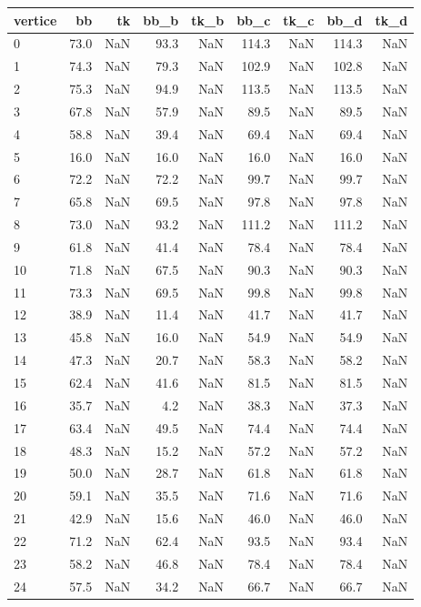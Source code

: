 \begin{tabular}{lrrrrrrrr}
\toprule
vertice & bb & tk & bb_b & tk_b & bb_c & tk_c & bb_d & tk_d \\
\midrule
0 & 73.0 & NaN & 93.3 & NaN & 114.3 & NaN & 114.3 & NaN \\
1 & 74.3 & NaN & 79.3 & NaN & 102.9 & NaN & 102.8 & NaN \\
2 & 75.3 & NaN & 94.9 & NaN & 113.5 & NaN & 113.5 & NaN \\
3 & 67.8 & NaN & 57.9 & NaN & 89.5 & NaN & 89.5 & NaN \\
4 & 58.8 & NaN & 39.4 & NaN & 69.4 & NaN & 69.4 & NaN \\
5 & 16.0 & NaN & 16.0 & NaN & 16.0 & NaN & 16.0 & NaN \\
6 & 72.2 & NaN & 72.2 & NaN & 99.7 & NaN & 99.7 & NaN \\
7 & 65.8 & NaN & 69.5 & NaN & 97.8 & NaN & 97.8 & NaN \\
8 & 73.0 & NaN & 93.2 & NaN & 111.2 & NaN & 111.2 & NaN \\
9 & 61.8 & NaN & 41.4 & NaN & 78.4 & NaN & 78.4 & NaN \\
10 & 71.8 & NaN & 67.5 & NaN & 90.3 & NaN & 90.3 & NaN \\
11 & 73.3 & NaN & 69.5 & NaN & 99.8 & NaN & 99.8 & NaN \\
12 & 38.9 & NaN & 11.4 & NaN & 41.7 & NaN & 41.7 & NaN \\
13 & 45.8 & NaN & 16.0 & NaN & 54.9 & NaN & 54.9 & NaN \\
14 & 47.3 & NaN & 20.7 & NaN & 58.3 & NaN & 58.2 & NaN \\
15 & 62.4 & NaN & 41.6 & NaN & 81.5 & NaN & 81.5 & NaN \\
16 & 35.7 & NaN & 4.2 & NaN & 38.3 & NaN & 37.3 & NaN \\
17 & 63.4 & NaN & 49.5 & NaN & 74.4 & NaN & 74.4 & NaN \\
18 & 48.3 & NaN & 15.2 & NaN & 57.2 & NaN & 57.2 & NaN \\
19 & 50.0 & NaN & 28.7 & NaN & 61.8 & NaN & 61.8 & NaN \\
20 & 59.1 & NaN & 35.5 & NaN & 71.6 & NaN & 71.6 & NaN \\
21 & 42.9 & NaN & 15.6 & NaN & 46.0 & NaN & 46.0 & NaN \\
22 & 71.2 & NaN & 62.4 & NaN & 93.5 & NaN & 93.4 & NaN \\
23 & 58.2 & NaN & 46.8 & NaN & 78.4 & NaN & 78.4 & NaN \\
24 & 57.5 & NaN & 34.2 & NaN & 66.7 & NaN & 66.7 & NaN \\

\end{tabular}
